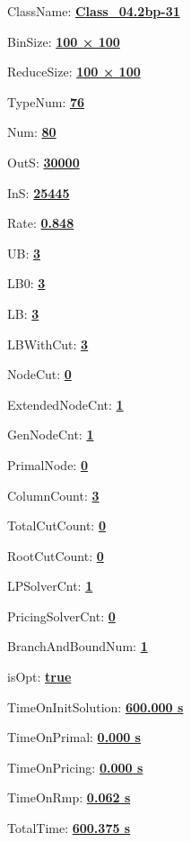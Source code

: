 \documentclass[11pt]{article}
\begin{document}
\pagestyle{empty}


ClassName: \underline{\textbf{Class_04.2bp-31}}
\par
BinSize: \underline{\textbf{100 × 100}}
\par
ReduceSize: \underline{\textbf{100 × 100}}
\par
TypeNum: \underline{\textbf{76}}
\par
Num: \underline{\textbf{80}}
\par
OutS: \underline{\textbf{30000}}
\par
InS: \underline{\textbf{25445}}
\par
Rate: \underline{\textbf{0.848}}
\par
UB: \underline{\textbf{3}}
\par
LB0: \underline{\textbf{3}}
\par
LB: \underline{\textbf{3}}
\par
LBWithCut: \underline{\textbf{3}}
\par
NodeCut: \underline{\textbf{0}}
\par
ExtendedNodeCnt: \underline{\textbf{1}}
\par
GenNodeCnt: \underline{\textbf{1}}
\par
PrimalNode: \underline{\textbf{0}}
\par
ColumnCount: \underline{\textbf{3}}
\par
TotalCutCount: \underline{\textbf{0}}
\par
RootCutCount: \underline{\textbf{0}}
\par
LPSolverCnt: \underline{\textbf{1}}
\par
PricingSolverCnt: \underline{\textbf{0}}
\par
BranchAndBoundNum: \underline{\textbf{1}}
\par
isOpt: \underline{\textbf{true}}
\par
TimeOnInitSolution: \underline{\textbf{600.000 s}}
\par
TimeOnPrimal: \underline{\textbf{0.000 s}}
\par
TimeOnPricing: \underline{\textbf{0.000 s}}
\par
TimeOnRmp: \underline{\textbf{0.062 s}}
\par
TotalTime: \underline{\textbf{600.375 s}}
\par
\newpage
\end{document}
